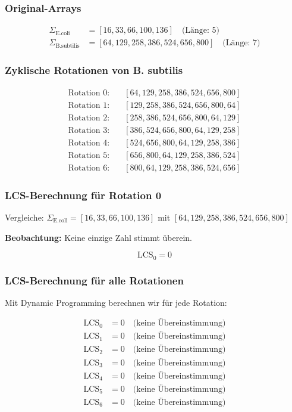 \documentclass[a4paper,12pt]{article}
\theoremstyle{definition}
\begin{document}
\subsubsection*{Original-Arrays}

\begin{align*}
\Sigma_{\text{E.coli}} &= [16, 33, 66, 100, 136] \quad \text{(Länge: 5)} \\
\Sigma_{\text{B.subtilis}} &= [64, 129, 258, 386, 524, 656, 800] \quad \text{(Länge: 7)}
\end{align*}

\subsubsection*{Zyklische Rotationen von B. subtilis}

\begin{align*}
\text{Rotation 0:} \quad &[64, 129, 258, 386, 524, 656, 800] \\
\text{Rotation 1:} \quad &[129, 258, 386, 524, 656, 800, 64] \\
\text{Rotation 2:} \quad &[258, 386, 524, 656, 800, 64, 129] \\
\text{Rotation 3:} \quad &[386, 524, 656, 800, 64, 129, 258] \\
\text{Rotation 4:} \quad &[524, 656, 800, 64, 129, 258, 386] \\
\text{Rotation 5:} \quad &[656, 800, 64, 129, 258, 386, 524] \\
\text{Rotation 6:} \quad &[800, 64, 129, 258, 386, 524, 656]
\end{align*}

\subsubsection*{LCS-Berechnung für Rotation 0}

Vergleiche: $\Sigma_{\text{E.coli}} = [16, 33, 66, 100, 136]$ mit $[64, 129, 258, 386, 524, 656, 800]$

\textbf{Beobachtung:} Keine einzige Zahl stimmt überein.

\[
\text{LCS}_0 = 0
\]

\subsubsection*{LCS-Berechnung für alle Rotationen}

Mit Dynamic Programming berechnen wir für jede Rotation:

\begin{align*}
\text{LCS}_0 &= 0 \quad \text{(keine Übereinstimmung)} \\
\text{LCS}_1 &= 0 \quad \text{(keine Übereinstimmung)} \\
\text{LCS}_2 &= 0 \quad \text{(keine Übereinstimmung)} \\
\text{LCS}_3 &= 0 \quad \text{(keine Übereinstimmung)} \\
\text{LCS}_4 &= 0 \quad \text{(keine Übereinstimmung)} \\
\text{LCS}_5 &= 0 \quad \text{(keine Übereinstimmung)} \\
\text{LCS}_6 &= 0 \quad \text{(keine Übereinstimmung)}
\end{align*}
\end{document}
